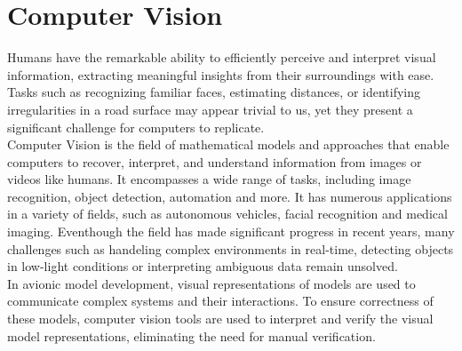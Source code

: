 \section{Computer Vision}
\label{sec:computer_vision}
Humans have the remarkable ability to efficiently perceive and interpret visual information, extracting meaningful insights from their surroundings with ease. Tasks such as recognizing familiar faces, estimating distances, or identifying irregularities in a road surface may appear trivial to us, yet they present a significant challenge for computers to replicate.\\
Computer Vision is the field of mathematical models and approaches that enable computers to recover, interpret, and understand information from images or videos like humans. It encompasses a wide range of tasks, including image recognition, object detection, automation and more. It has numerous applications in a variety of fields, such as autonomous vehicles, facial recognition and medical imaging. Eventhough the field has made significant progress in recent years, many challenges such as handeling complex environments in real-time, detecting objects in low-light conditions or interpreting ambiguous data remain unsolved.\\
In avionic model development, visual representations of models are used to communicate complex systems and their interactions. To ensure correctness of these models, computer vision tools are used to interpret and verify the visual model representations, eliminating the need for manual verification.

